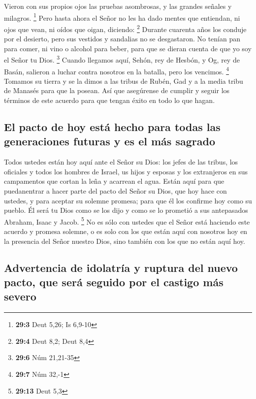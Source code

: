  Vieron con sus propios ojos las pruebas asombrosas, y las
grandes señales y milagros. \footnote{\textbf{29:3} Deut 5,26; Is 6,9-10}
 Pero hasta ahora el Señor no les ha dado mentes que
entiendan, ni ojos que vean, ni oídos que oigan, diciendo: \footnote{\textbf{29:4}
  Deut 8,2; Deut 8,4}  Durante cuarenta años los conduje
por el desierto, pero sus vestidos y sandalias no se desgastaron.
 No tenían pan para comer, ni vino o alcohol para beber,
para que se dieran cuenta de que yo soy el Señor tu Dios. \footnote{\textbf{29:6}
  Núm 21,21-35}  Cuando llegamos aquí, Sehón, rey de
Hesbón, y Og, rey de Basán, salieron a luchar contra nosotros en la
batalla, pero los vencimos. \footnote{\textbf{29:7} Núm 32,-1}
 Tomamos su tierra y se la dimos a las tribus de Rubén,
Gad y a la media tribu de Manasés para que la posean.  Así
que asegúrense de cumplir y seguir los términos de este acuerdo para que
tengan éxito en todo lo que hagan.

\hypertarget{el-pacto-de-hoy-estuxe1-hecho-para-todas-las-generaciones-futuras-y-es-el-muxe1s-sagrado}{%
\subsection{El pacto de hoy está hecho para todas las generaciones
futuras y es el más
sagrado}\label{el-pacto-de-hoy-estuxe1-hecho-para-todas-las-generaciones-futuras-y-es-el-muxe1s-sagrado}}

 Todos ustedes están hoy aquí ante el Señor su Dios: los
jefes de las tribus, los oficiales y todos los hombres de Israel,
 us hijos y esposas y los extranjeros en sus campamentos
que cortan la leña y acarrean el agua.  Están aquí para
que puedanentrar a hacer parte del pacto del Señor su Dios, que hoy hace
con ustedes, y para aceptar su solemne promesa;  para que
él los confirme hoy como su pueblo. Él será tu Dios como se los dijo y
como se lo prometió a sus antepasados Abraham, Isaac y Jacob.
\footnote{\textbf{29:13} Deut 5,3}  No es sólo con
ustedes que el Señor está haciendo este acuerdo y promesa solemne,
 o es solo con los que están aquí con nosotros hoy en la
presencia del Señor nuestro Dios, sino también con los que no están aquí
hoy.

\hypertarget{advertencia-de-idolatruxeda-y-ruptura-del-nuevo-pacto-que-seruxe1-seguido-por-el-castigo-muxe1s-severo}{%
\subsection{Advertencia de idolatría y ruptura del nuevo pacto, que será
seguido por el castigo más
severo}\label{advertencia-de-idolatruxeda-y-ruptura-del-nuevo-pacto-que-seruxe1-seguido-por-el-castigo-muxe1s-severo}}

